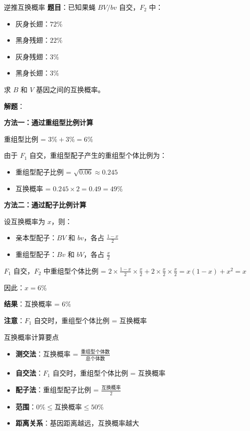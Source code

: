 \documentclass[a4paper,11pt]{ctexart}
\begin{document}
\begin{examplebox}{逆推互换概率}
\textbf{题目}：已知果蝇 $BV/bv$ 自交，$F_2$ 中：
\begin{itemize}[leftmargin=2em]
    \item 灰身长翅：$72\%$
    \item 黑身残翅：$22\%$
    \item 灰身残翅：$3\%$
    \item 黑身长翅：$3\%$
\end{itemize}

求 $B$ 和 $V$ 基因之间的互换概率。

\textbf{解题}：

\textbf{方法一：通过重组型比例计算}

重组型比例 = $3\% + 3\% = 6\%$

由于 $F_1$ 自交，重组型配子产生的重组型个体比例为：
\begin{itemize}[leftmargin=2em]
    \item 重组型配子比例 = $\sqrt{0.06} \approx 0.245$
    \item 互换概率 = $0.245 \times 2 = 0.49 = 49\%$
\end{itemize}

\textbf{方法二：通过配子比例计算}

设互换概率为 $x$，则：
\begin{itemize}[leftmargin=2em]
    \item 亲本型配子：$BV$ 和 $bv$，各占 $\frac{1-x}{2}$
    \item 重组型配子：$Bv$ 和 $bV$，各占 $\frac{x}{2}$
\end{itemize}

$F_1$ 自交，$F_2$ 中重组型个体比例 = $2 \times \frac{1-x}{2} \times \frac{x}{2} + 2 \times \frac{x}{2} \times \frac{x}{2} = x(1-x) + x^2 = x$

因此：$x = 6\%$

\textbf{结果}：互换概率 = $6\%$

\textbf{注意}：$F_1$ 自交时，重组型个体比例 = 互换概率
\end{examplebox}

\begin{lemmabox}{互换概率计算要点}
\begin{itemize}[leftmargin=2em]
    \item \textbf{测交法}：互换概率 = $\frac{\text{重组型个体数}}{\text{总个体数}}$
    \item \textbf{自交法}：$F_1$ 自交时，重组型个体比例 = 互换概率
    \item \textbf{配子法}：重组型配子比例 = $\frac{\text{互换概率}}{2}$
    \item \textbf{范围}：$0\% \leq \text{互换概率} \leq 50\%$
    \item \textbf{距离关系}：基因距离越远，互换概率越大
\end{itemize}
\end{lemmabox}
\end{document}
